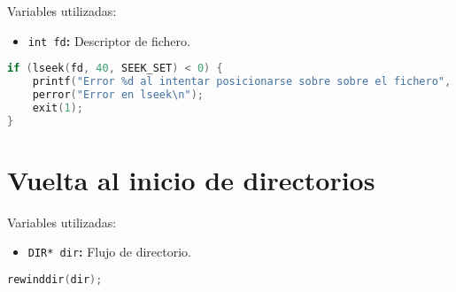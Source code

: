 Variables utilizadas:

\begin{itemize}
	\item\texttt{int fd}\textbf{:} Descriptor de fichero.
\end{itemize}

\begin{lstlisting}[language=C]
if (lseek(fd, 40, SEEK_SET) < 0) {
	printf("Error %d al intentar posicionarse sobre sobre el fichero", errno);
	perror("Error en lseek\n");
	exit(1);
}
\end{lstlisting}

\section{Vuelta al inicio de directorios}

Variables utilizadas:

\begin{itemize}
	\item\texttt{DIR* dir}\textbf{:} Flujo de directorio.
\end{itemize}

\begin{lstlisting}[language=C]
rewinddir(dir);
\end{lstlisting}

